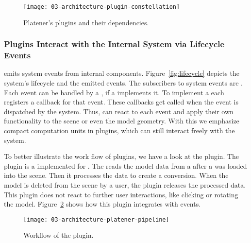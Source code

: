 \documentclass[../03-Architecture.tex]{subfiles}
\begin{document}
\begin{figure}[h]
  \centering
  \texttt{[image: 03-architecture-plugin-constellation]}
  \caption{Platener's plugins and their dependencies.}
  \label{fig:plugin-constellation}
\end{figure}

\subsubsection{Plugins Interact with the Internal System via
  Lifecycle Events}


{\convertify} emits system events from internal components.
Figure~\ref{fig:lifecycle} depicts the system's lifecycle
and the emitted events. The subscribers to system events are
. Each event can be handled by a
, if a  implements it. To
implement a  each  registers
a callback for that event. These callbacks get called when
the event is dispatched by the system. Thus, 
can react to each event and apply their own functionality to
the scene or even the model geometry. With this we emphasize
compact computation units in plugins, which can still
interact freely with the system.

To better illustrate the work flow of plugins, we have a look at the
 plugin. The  plugin is
a  implemented for {\platener}. The  reads
the model data from a  after a {\threedmodel} was loaded
into the scene. Then it processes the data to create a {\lasercutter}
conversion. When the model is deleted from the scene by a user, the
plugin releases the processed data. This plugin does not react to
further user interactions, like clicking or rotating the model.
Figure~\ref{fig:workflow-platener-pipeline} shows how this plugin
integrates with {\convertify} events.

\begin{figure}[h]
  \centering
  \texttt{[image: 03-architecture-platener-pipeline]}
  \caption{Workflow of the  plugin.}
  \label{fig:workflow-platener-pipeline}
\end{figure}
\end{document}
